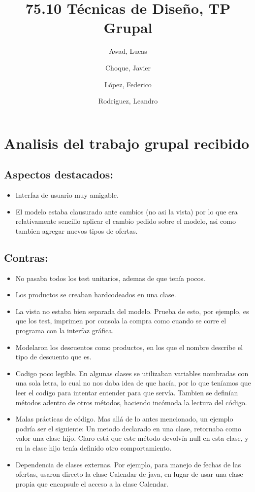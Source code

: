 \documentclass[a4paper,10pt, notitlepage]{article}
\title{\textbf{75.10 Técnicas de Diseño, TP Grupal}}
\author{Awad, Lucas \and Choque, Javier \and López, Federico \and Rodriguez, Leandro}
\date{}
\begin{document}
\maketitle

\thispagestyle{empty}

\newpage

\section{Analisis del trabajo grupal recibido}

\subsection{Aspectos destacados:}
\begin{itemize}
\item Interfaz de usuario muy amigable. 
\item El modelo estaba clausurado ante cambios (no asi la vista) por lo que era relativamente sencillo aplicar el cambio pedido 
sobre el modelo, asi como tambien agregar nuevos tipos de ofertas.
\end{itemize}

\subsection{Contras:}
\begin{itemize}
\item No pasaba todos los test unitarios, ademas de que tenía pocos.
\item Los productos se creaban hardcodeados en una clase.
\item La vista no estaba bien separada del modelo. Prueba de esto, por ejemplo, es que los test, imprimen por consola la compra 
como cuando se corre el programa con la interfaz gráfica.
\item Modelaron los descuentos como productos, en los que el nombre describe el tipo de descuento que es.
\item Codigo poco legible. En algunas clases se utilizaban variables nombradas con una sola letra, lo cual no nos daba idea de que 
hacía, por lo que teníamos que leer el codigo para intentar entender para que servía. Tambien se definían métodos adentro de otros 
métodos, haciendo incómoda la lectura del código.
\item Malas prácticas de código. Mas allá de lo antes mencionado, un ejemplo podría ser el siguiente: Un metodo declarado en una 
clase, retornaba como valor una clase hijo. Claro está que este método devolvía null en esta clase, y en la clase hijo tenía 
definido otro comportamiento.
\item Dependencia de clases externas. Por ejemplo, para manejo de fechas de las ofertas, usaron directo la clase Calendar de java, 
en lugar de usar una clase propia que encapsule el acceso a la clase Calendar.
\end{itemize}
\end{document}
